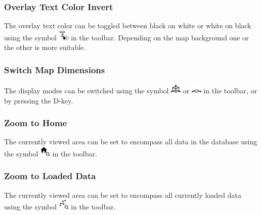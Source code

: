 \subsubsection{Overlay Text Color Invert}

The overlay text color can be toggled between black on white or white on black using the symbol \includegraphics[width=0.5cm,frame]{../../data/icons/text_invert.png} in the toolbar. Depending on the map background one or the other is more suitable.

\subsubsection{Switch Map Dimensions}

The display modes can be switched using the symbol \includegraphics[width=0.5cm,frame]{../../data/icons/3d.png} or \includegraphics[width=0.5cm,frame]{../../data/icons/2d.png} in the toolbar, or by pressing the D-key. 

\subsubsection{Zoom to Home}

The currently viewed area can be set to encompass all data in the database using the symbol \includegraphics[width=0.5cm,frame]{../../data/icons/zoom_home.png} in the toolbar.

\subsubsection{Zoom to Loaded Data}

The currently viewed area can be set to encompass all currently loaded data using the symbol \includegraphics[width=0.5cm,frame]{../../data/icons/zoom_geometry.png} in the toolbar.

